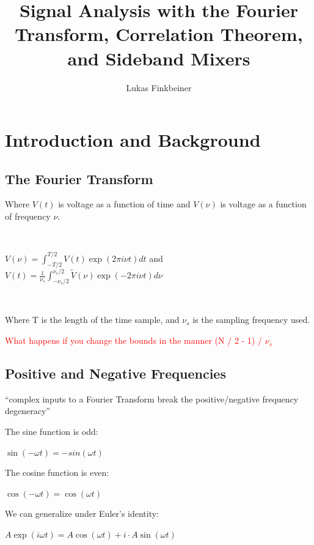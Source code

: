 \documentclass[a4paper]{article}
\title{Signal Analysis with the Fourier Transform, Correlation Theorem, and Sideband Mixers}
\author{Lukas Finkbeiner}
\begin{document}
\maketitle

\begin{abstract}



\end{abstract}


\section{Introduction and Background}

\subsection{The Fourier Transform}

Where $V(t)$ is voltage as a function of time and $V(\nu)$ is voltage as a function of frequency $\nu$.

\

$V(\nu) = \int_{-T / 2}^{T / 2} V(t) \exp(2 \pi i \nu t) dt$ and $V(t) = \frac{1}{\nu_s} \int_{- \nu_s / 2}^{\nu_s / 2} \tilde{V}(\nu) \exp(-2 \pi i \nu t) d \nu$

\

Where T is the length of the time sample, and $\nu_s$ is the sampling frequency used.

\textcolor{red}{What happens if you change the bounds in the manner (N / 2 - 1) / $\nu_s$}


\subsection{Positive and Negative Frequencies}

``complex inputs to a Fourier Transform break the positive/negative frequency degeneracy''

The sine function is odd:

$\sin(-\omega t) = -sin(\omega t)$

The cosine function is even:

$\cos(-\omega t) = \cos (\omega t)$

We can generalize under Euler's identity:

$A\exp(i \omega t) = A \cos(\omega t) + i \cdot A \sin(\omega t)$
\end{document}
